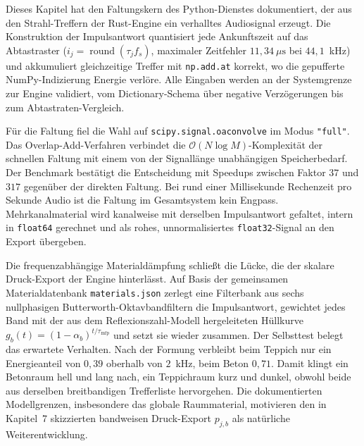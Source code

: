 Dieses Kapitel hat den Faltungskern des Python-Dienstes dokumentiert, der aus den
Strahl-Treffern der Rust-Engine ein verhalltes Audiosignal erzeugt. Die
Konstruktion der Impulsantwort quantisiert jede Ankunftszeit auf das Abtastraster
($i_j = \operatorname{round}(\tau_j f_s)$, maximaler Zeitfehler
$11{,}34~\mu\mathrm{s}$ bei $44{,}1$~kHz) und akkumuliert gleichzeitige Treffer
mit \texttt{np.add.at} korrekt, wo die gepufferte NumPy-Indizierung Energie
verlöre. Alle Eingaben werden an der Systemgrenze zur Engine validiert, vom
Dictionary-Schema über negative Verzögerungen bis zum Abtastraten-Vergleich.

Für die Faltung fiel die Wahl auf \texttt{scipy.signal.oaconvolve} im Modus
\texttt{"full"}. Das Overlap-Add-Verfahren verbindet die
$\mathcal{O}(N \log M)$-Komplexität der schnellen Faltung mit einem von der
Signallänge unabhängigen Speicherbedarf. Der Benchmark bestätigt die Entscheidung
mit Speedups zwischen Faktor $37$ und $317$ gegenüber der direkten Faltung. Bei
rund einer Millisekunde Rechenzeit pro Sekunde Audio ist die Faltung im
Gesamtsystem kein Engpass. Mehrkanalmaterial wird kanalweise mit derselben
Impulsantwort gefaltet, intern in \texttt{float64} gerechnet und als rohes,
unnormalisiertes \texttt{float32}-Signal an den Export übergeben.

Die frequenzabhängige Materialdämpfung schließt die Lücke, die der skalare
Druck-Export der Engine hinterlässt. Auf Basis der gemeinsamen Materialdatenbank
\texttt{materials.json} zerlegt eine Filterbank aus sechs nullphasigen
Butterworth-Oktavbandfiltern die Impulsantwort, gewichtet jedes Band mit der aus
dem Reflexionszahl-Modell hergeleiteten Hüllkurve
$g_b(t) = (1 - \alpha_b)^{t/\tau_{\mathrm{mfp}}}$ und setzt sie wieder zusammen.
Der Selbsttest belegt das erwartete Verhalten. Nach der Formung verbleibt beim
Teppich nur ein Energieanteil von $0{,}39$ oberhalb von $2$~kHz, beim Beton
$0{,}71$. Damit klingt ein Betonraum hell und lang nach, ein Teppichraum kurz und
dunkel, obwohl beide aus derselben breitbandigen Trefferliste hervorgehen. Die
dokumentierten Modellgrenzen, insbesondere das globale Raummaterial, motivieren
den in Kapitel~7 skizzierten bandweisen Druck-Export $p_{j,b}$ als natürliche
Weiterentwicklung.

